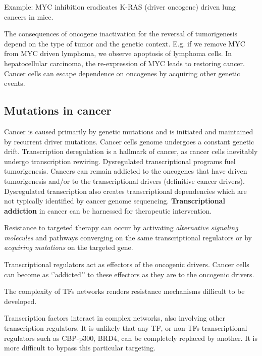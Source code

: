 Example: MYC inhibition eradicates K-RAS (driver oncogene) driven lung cancers in mice.

The consequences of oncogene inactivation for the reversal of tumorigenesis depend on the type of tumor and the genetic context. E.g. if we remove MYC from MYC driven lymphoma, we observe apoptosis of lymphoma cells. In hepatocellular carcinoma, the re-expression of MYC leads to restoring cancer. Cancer cells can escape dependence on oncogenes by acquiring other genetic events.

\subsection{Mutations in cancer}

Cancer is caused primarily by genetic mutations and is initiated and maintained by recurrent driver mutations. Cancer cells genome undergoes a constant genetic drift. Transcription deregulation is a hallmark of cancer, as cancer cells inevitably undergo transcription rewiring. Dysregulated transcriptional programs fuel tumorigenesis. Cancers can remain addicted to the oncogenes that have driven tumorigenesis and/or to the transcriptional drivers (definitive cancer drivers). Dysregulated transcription also creates transcriptional dependencies which are not typically identified by cancer genome sequencing. \textbf{Transcriptional addiction} in cancer can be harnessed for therapeutic intervention.

Resistance to targeted therapy can occur by activating \emph{alternative signaling molecules} and pathways converging on the same transcriptional regulators or by \emph{acquiring mutations} on the targeted gene.

Transcriptional regulators act as effectors of the oncogenic drivers. Cancer cells can become as `'addicted'' to these effectors as they are to the oncogenic drivers.

The complexity of TFs networks renders resistance mechanisms difficult to be developed.

Transcription factors interact in complex networks, also involving other transcription regulators. It is unlikely that any TF, or non-TFs transcriptional regulators such as CBP-p300, BRD4, can be completely replaced by another. It is more difficult to bypass this particular targeting.

